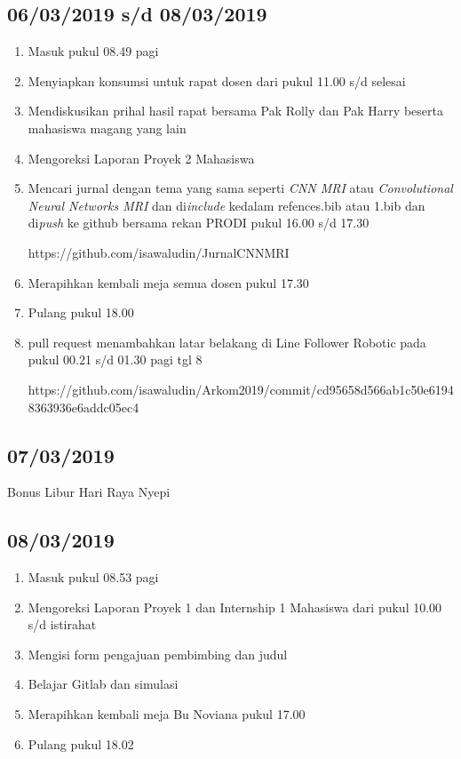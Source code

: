 \subsection{06/03/2019 s/d 08/03/2019}
\begin{enumerate}
  \item Masuk pukul 08.49 pagi
  \item Menyiapkan konsumsi untuk rapat dosen dari pukul 11.00 s/d selesai
  \item Mendiskusikan prihal hasil rapat bersama Pak Rolly dan Pak Harry beserta mahasiswa magang yang lain
  \item Mengoreksi Laporan Proyek 2 Mahasiswa
  \item Mencari jurnal dengan tema yang sama seperti \textit{CNN MRI} atau \textit{Convolutional Neural Networks MRI} dan di\textit{include} kedalam refences.bib atau 1.bib dan di\textit{push} ke github bersama rekan PRODI pukul 16.00 s/d 17.30
  \par https://github.com/isawaludin/JurnalCNNMRI
  \item Merapihkan kembali meja semua dosen pukul 17.30
  \item Pulang pukul 18.00
  \item pull request menambahkan latar belakang di Line Follower Robotic pada pukul 00.21 s/d 01.30 pagi tgl 8
  \par https://github.com/isawaludin/Arkom2019/commit/cd95658d566ab1c50e61948363936e6addc05ec4
\end{enumerate} 

\subsection{07/03/2019}
Bonus Libur Hari Raya Nyepi

\subsection{08/03/2019}
\begin{enumerate}
  \item Masuk pukul 08.53 pagi
  \item Mengoreksi Laporan Proyek 1 dan Internship 1 Mahasiswa dari pukul 10.00 s/d istirahat
  \item Mengisi form pengajuan pembimbing dan judul
  \item Belajar Gitlab dan simulasi
  \item Merapihkan kembali meja Bu Noviana pukul 17.00
  \item Pulang pukul 18.02
\end{enumerate}

